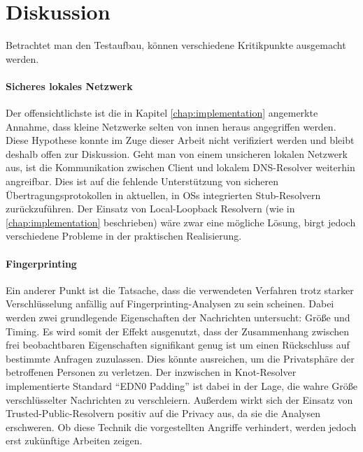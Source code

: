 \section{Diskussion}
Betrachtet man den Testaufbau, können verschiedene Kritikpunkte ausgemacht werden. 

\paragraph{Sicheres lokales Netzwerk}
Der offensichtlichste ist die in Kapitel \ref{chap:implementation} angemerkte Annahme, dass kleine Netzwerke selten von innen heraus angegriffen werden. Diese Hypothese konnte im Zuge dieser Arbeit nicht verifiziert werden und bleibt deshalb offen zur Diskussion. Geht man von einem unsicheren lokalen Netzwerk aus, ist die Kommunikation zwischen Client und lokalem DNS-Resolver weiterhin angreifbar. Dies ist auf die fehlende Unterstützung von sicheren Übertragungsprotokollen in aktuellen, in \acp{OS} integrierten Stub-Resolvern zurückzuführen. Der Einsatz von Local-Loopback Resolvern (wie in \ref{chap:implementation} beschrieben) wäre zwar eine mögliche Lösung, birgt jedoch verschiedene Probleme in der praktischen Realisierung.

\paragraph{Fingerprinting}
Ein anderer Punkt ist die Tatsache, dass die verwendeten Verfahren trotz starker Verschlüsselung anfällig auf Fingerprinting-Analysen zu sein scheinen\cite{Shulman2014}\cite{Siby2018}. Dabei werden zwei grundlegende Eigenschaften der Nachrichten untersucht: Größe und Timing. Es wird somit der Effekt ausgenutzt, dass der Zusammenhang zwischen frei beobachtbaren Eigenschaften signifikant genug ist um einen Rückschluss auf bestimmte Anfragen zuzulassen. Dies könnte ausreichen, um die Privatsphäre der betroffenen Personen zu verletzen. Der inzwischen in Knot-Resolver implementierte Standard ``EDN0 Padding''\cite{rfc7830} ist dabei in der Lage, die wahre Größe verschlüsselter Nachrichten zu verschleiern. Außerdem wirkt sich der Einsatz von Trusted-Public-Resolvern positiv auf die Privacy aus, da sie die Analysen erschweren\cite{Shulman2014}. Ob diese Technik die vorgestellten Angriffe verhindert, werden jedoch erst zukünftige Arbeiten zeigen. 


